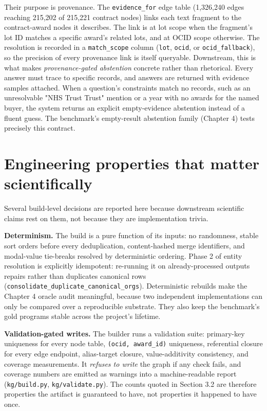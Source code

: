 Their purpose is provenance. The \texttt{evidence\_for} edge table (1,326,240 edges reaching 215,202 of 215,221 contract nodes) links each text fragment to the contract-award nodes it describes. The link is at lot scope when the fragment's lot ID matches a specific award's related lots, and at OCID scope otherwise. The resolution is recorded in a \texttt{match\_scope} column (\texttt{lot}, \texttt{ocid}, or \texttt{ocid\_fallback}), so the precision of every provenance link is itself queryable. Downstream, this is what makes \emph{provenance-gated abstention} concrete rather than rhetorical. Every answer must trace to specific records, and answers are returned with evidence samples attached. When a question's constraints match no records, such as an unresolvable "NHS Trust Trust" mention or a year with no awards for the named buyer, the system returns an explicit empty-evidence abstention instead of a fluent guess. The benchmark's empty-result abstention family (Chapter 4) tests precisely this contract.

\section{Engineering properties that matter scientifically}\label{sec:engineering-properties-that-matter-scien}

Several build-level decisions are reported here because downstream scientific claims rest on them, not because they are implementation trivia.

\textbf{Determinism.} The build is a pure function of its inputs: no randomness, stable sort orders before every deduplication, content-hashed merge identifiers, and modal-value tie-breaks resolved by deterministic ordering. Phase 2 of entity resolution is explicitly idempotent: re-running it on already-processed outputs repairs rather than duplicates canonical rows (\texttt{consolidate\_duplicate\_canonical\_orgs}). Deterministic rebuilds make the Chapter 4 oracle audit meaningful, because two independent implementations can only be compared over a reproducible substrate. They also keep the benchmark's gold programs stable across the project's lifetime.

\textbf{Validation-gated writes.} The builder runs a validation suite: primary-key uniqueness for every node table, \texttt{(ocid, award\_id)} uniqueness, referential closure for every edge endpoint, alias-target closure, value-additivity consistency, and coverage measurements. It \emph{refuses to write} the graph if any check fails, and coverage numbers are emitted as warnings into a machine-readable report (\texttt{kg/build.py}, \texttt{kg/validate.py}). The counts quoted in Section 3.2 are therefore properties the artifact is guaranteed to have, not properties it happened to have once.

